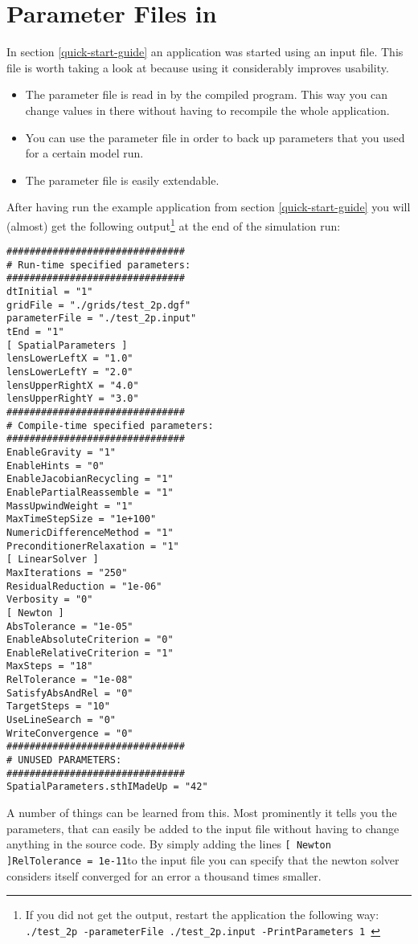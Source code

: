 \section{Parameter Files in \Dumux}
In section \ref{quick-start-guide} an application was started using an input file. 
This file is worth taking a look at because using it considerably improves usability. 

\begin{itemize}
 \item The parameter file is read in by the compiled program. This way you can change 
values in there without having to recompile the whole application. 
\item You can use the parameter file in order to back up parameters that you used for a certain model run. 
\item The parameter file is easily extendable. 
\end{itemize}

After having run the example application from  section \ref{quick-start-guide} you will (almost) get the following output\footnote{If you did not get the output, restart the application the following way:
  \texttt{./test{\_}2p -parameterFile ./test\_2p.input -PrintParameters 1 }} at the end of the simulation run:
\begin{lstlisting}[style=Bash]
###############################
# Run-time specified parameters:
###############################
dtInitial = "1"
gridFile = "./grids/test_2p.dgf"
parameterFile = "./test_2p.input"
tEnd = "1"
[ SpatialParameters ]
lensLowerLeftX = "1.0"
lensLowerLeftY = "2.0"
lensUpperRightX = "4.0"
lensUpperRightY = "3.0"
###############################
# Compile-time specified parameters:
###############################
EnableGravity = "1"
EnableHints = "0"
EnableJacobianRecycling = "1"
EnablePartialReassemble = "1"
MassUpwindWeight = "1"
MaxTimeStepSize = "1e+100"
NumericDifferenceMethod = "1"
PreconditionerRelaxation = "1"
[ LinearSolver ]
MaxIterations = "250"
ResidualReduction = "1e-06"
Verbosity = "0"
[ Newton ]
AbsTolerance = "1e-05"
EnableAbsoluteCriterion = "0"
EnableRelativeCriterion = "1"
MaxSteps = "18"
RelTolerance = "1e-08"
SatisfyAbsAndRel = "0"
TargetSteps = "10"
UseLineSearch = "0"
WriteConvergence = "0"
###############################
# UNUSED PARAMETERS:
###############################
SpatialParameters.sthIMadeUp = "42"
\end{lstlisting}

A number of things can be learned from this. Most prominently it tells you the parameters, that can easily be added to the input file without having to change anything in the source code. 
By simply adding the lines  \newline \texttt{[ Newton ]\newline RelTolerance = 1e-11}\newline  to the input file you can specify that the newton solver considers itself converged for an error a thousand times smaller. 

